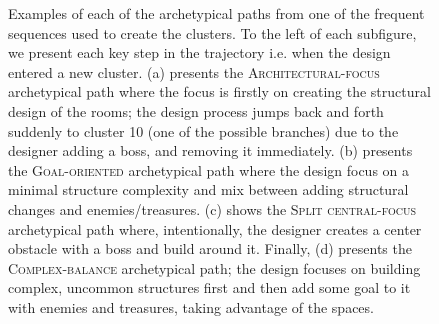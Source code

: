 \begin{figure}[t]
    \caption{Examples of each of the archetypical paths from one of the frequent sequences used to create the clusters. To the left of each subfigure, we present each key step in the trajectory i.e. when the design entered a new cluster. (a) presents the \textsc{Architectural-focus} archetypical path where the focus is firstly on creating the structural design of the rooms; the design process jumps back and forth suddenly to cluster 10 (one of the possible branches) due to the designer adding a boss, and removing it immediately. (b) presents the \textsc{Goal-oriented} archetypical path where the design focus on a minimal structure complexity and mix between adding structural changes and enemies/treasures. (c) shows the \textsc{Split central-focus} archetypical path where, intentionally, the designer creates a center obstacle with a boss and build around it. Finally, (d) presents the \textsc{Complex-balance} archetypical path; the design focuses on building complex, uncommon structures first and then add some goal to it with enemies and treasures, taking advantage of the spaces.}
    \label{fig:desPersonasExamples}
\end{figure}

